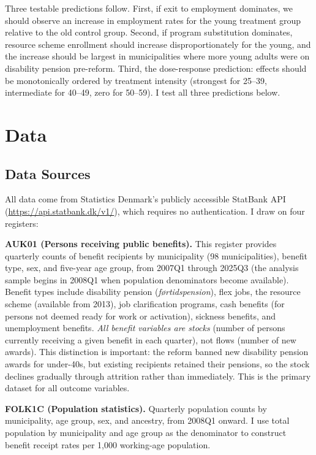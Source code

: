 \documentclass[12pt]{article}
\begin{document}
Three testable predictions follow. First, if exit to employment dominates, we should observe an increase in employment rates for the young treatment group relative to the old control group. Second, if program substitution dominates, resource scheme enrollment should increase disproportionately for the young, and the increase should be largest in municipalities where more young adults were on disability pension pre-reform. Third, the dose-response prediction: effects should be monotonically ordered by treatment intensity (strongest for 25--39, intermediate for 40--49, zero for 50--59). I test all three predictions below.


\section{Data}
\label{sec:data}

\subsection{Data Sources}

All data come from Statistics Denmark's publicly accessible StatBank API (\url{https://api.statbank.dk/v1/}), which requires no authentication. I draw on four registers:

\textbf{AUK01 (Persons receiving public benefits).} This register provides quarterly counts of benefit recipients by municipality (98 municipalities), benefit type, sex, and five-year age group, from 2007Q1 through 2025Q3 (the analysis sample begins in 2008Q1 when population denominators become available). Benefit types include disability pension (\textit{f\o{}rtidspension}), flex jobs, the resource scheme (available from 2013), job clarification programs, cash benefits (for persons not deemed ready for work or activation), sickness benefits, and unemployment benefits. \textit{All benefit variables are stocks} (number of persons currently receiving a given benefit in each quarter), not flows (number of new awards). This distinction is important: the reform banned new disability pension awards for under-40s, but existing recipients retained their pensions, so the stock declines gradually through attrition rather than immediately. This is the primary dataset for all outcome variables.

\textbf{FOLK1C (Population statistics).} Quarterly population counts by municipality, age group, sex, and ancestry, from 2008Q1 onward. I use total population by municipality and age group as the denominator to construct benefit receipt rates per 1,000 working-age population.
\end{document}
